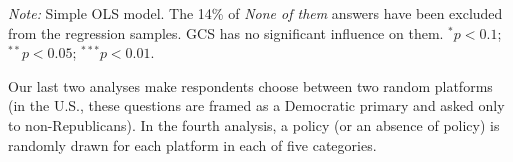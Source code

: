 
\begin{table} %
  \caption[Influence of the GCS on electoral prospects]{Preference for a progressive platform depending on whether it includes the GCS or not. (Question 28 in Supplementary Section D) 
Which of these candidates would you vote for? \textit{A; B; None of them} \\
} %
  \makebox[\textwidth][c]{}\label{tab:conjoint_c}
  {\footnotesize \textit{Note:} Simple OLS model. The 14\% of \textit{None of them} answers have been excluded from the regression samples. GCS has no significant influence on them. $^{*}p<0.1$; $^{**} p<0.05$; $^{***} p<0.01$. 
  }
\end{table}
Our last two analyses  make respondents choose between two random platforms (in the U.S., these questions are framed as a Democratic primary and asked only to non-Republicans).  %
In the fourth analysis, a policy (or an absence of policy) is randomly drawn for each platform in each of five categories.%
 
